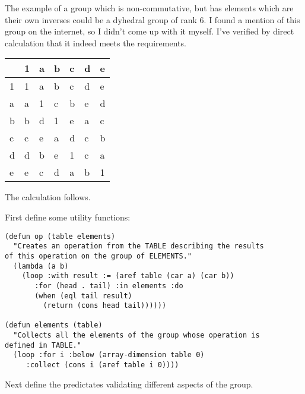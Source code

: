 \documentclass[11pt]{article}
\begin{document}
The example of a group which is non-commutative, but has elements which are
their own inverses could be a dyhedral group of rank 6.  I found a mention
of this group on the internet, so I didn't come up with it myself.  I've
verified by direct calculation that it indeed meets the requirements.

\begin{center}
\begin{tabular}{l|llllll}
 & 1 & a & b & c & d & e\\
\hline
1 & 1 & a & b & c & d & e\\
a & a & 1 & c & b & e & d\\
b & b & d & 1 & e & a & c\\
c & c & e & a & d & c & b\\
d & d & b & e & 1 & c & a\\
e & e & c & d & a & b & 1\\
\end{tabular}
\end{center}

The calculation follows.

First define some utility functions:

\clearpage

\lstset{language=Lisp,numbers=none}
\begin{lstlisting}
(defun op (table elements)
  "Creates an operation from the TABLE describing the results
of this operation on the group of ELEMENTS."
  (lambda (a b)
    (loop :with result := (aref table (car a) (car b))
       :for (head . tail) :in elements :do
       (when (eql tail result)
         (return (cons head tail))))))

(defun elements (table)
  "Collects all the elements of the group whose operation is
defined in TABLE."
  (loop :for i :below (array-dimension table 0)
     :collect (cons i (aref table i 0))))
\end{lstlisting}

Next define the predictates validating different aspects of the
group.
\end{document}
